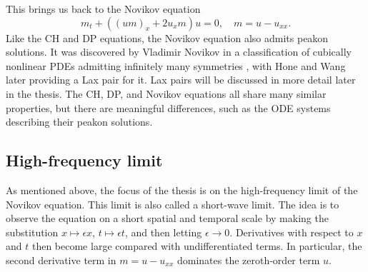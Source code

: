 \documentclass[english,master]{liumaiex}
\theoremstyle{thesisplain}
\theoremstyle{thesisdefinition}
\numberwithin{equation}{section}
\begin{document}
This brings us back to the Novikov equation
\begin{equation} \label{eq:Novikov_equation}
	m_t + ((um)_x + 2u_xm) u = 0,\quad m = u - u_{xx}.
\end{equation}
Like the CH and DP equations, the Novikov equation also admits peakon solutions. It was discovered by Vladimir Novikov in a classification of cubically nonlinear PDEs admitting infinitely many symmetries \cite{Novikov_2009}, with Hone and Wang \cite{Hone_2008} later providing a Lax pair for it. Lax pairs will be discussed in more detail later in the thesis. The CH, DP, and Novikov equations all share many similar properties, but there are meaningful differences, such as the ODE systems describing their peakon solutions.

\subsection{High-frequency limit} \label{sec:high-frequency-limit}

As mentioned above, the focus of the thesis is on the high-frequency limit of the Novikov equation. This limit is also called a short-wave limit. The idea is to observe the equation on a short spatial and temporal scale by making the substitution $x \mapsto \epsilon x$, $t \mapsto \epsilon t$, and then letting $\epsilon \rightarrow 0$. Derivatives with respect to $x$ and $t$ then become large compared with undifferentiated terms. In particular, the second derivative term in $m=u-u_{xx}$ dominates the zeroth-order term $u$.
\end{document}
